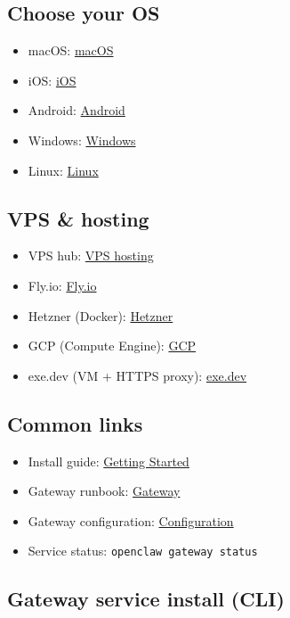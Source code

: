 \subsection{Choose your OS}


\begin{itemize}
  \item macOS: \href{/platforms/macos}{macOS}
  \item iOS: \href{/platforms/ios}{iOS}
  \item Android: \href{/platforms/android}{Android}
  \item Windows: \href{/platforms/windows}{Windows}
  \item Linux: \href{/platforms/linux}{Linux}
\end{itemize}


\subsection{VPS \& hosting}


\begin{itemize}
  \item VPS hub: \href{/vps}{VPS hosting}
  \item Fly.io: \href{/install/fly}{Fly.io}
  \item Hetzner (Docker): \href{/install/hetzner}{Hetzner}
  \item GCP (Compute Engine): \href{/install/gcp}{GCP}
  \item exe.dev (VM + HTTPS proxy): \href{/install/exe-dev}{exe.dev}
\end{itemize}


\subsection{Common links}


\begin{itemize}
  \item Install guide: \href{/start/getting-started}{Getting Started}
  \item Gateway runbook: \href{/gateway}{Gateway}
  \item Gateway configuration: \href{/gateway/configuration}{Configuration}
  \item Service status: \texttt{openclaw gateway status}
\end{itemize}


\subsection{Gateway service install (CLI)}


